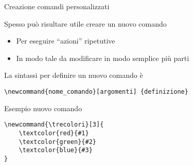 \begin{frame}[fragile]{Creazione comandi personalizzati}

Spesso può risultare utile creare un nuovo comando
\begin{itemize}
	\item Per eseguire ``azioni'' ripetutive
	\item In modo tale da modificare in modo semplice più parti
\end{itemize}

La sintassi per definire un nuovo comando è
\begin{center}
    \texttt{\textbackslash{}newcommand\{nome\_comando\}[argomenti]
    \{definizione\}}
\end{center}

\begin{exampleblock}{Esempio nuovo comando}
	\begin{lstlisting}
\newcommand{\trecolori}[3]{
    \textcolor{red}{#1} 
    \textcolor{green}{#2} 
    \textcolor{blue}{#3}
}
	\end{lstlisting}
\end{exampleblock}


\end{frame}